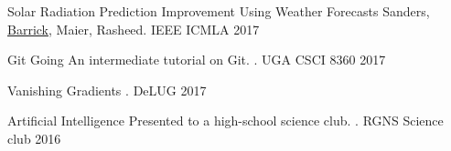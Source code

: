 
\begin{cvhonors}

\cvhonor
{Solar Radiation Prediction Improvement Using Weather Forecasts}
{Sanders, \underline{Barrick}, Maier, Rasheed.}
{IEEE ICMLA}
{2017}

\end{cvhonors}


\begin{cvhonors}

\cvhonor
{Git Going}
{An intermediate tutorial on Git. .}
{UGA CSCI 8360}
{2017}

\cvhonor
{Vanishing Gradients}
{.}
{DeLUG}
{2017}

\cvhonor
{Artificial Intelligence}
{Presented to a high-school science club. .}
{RGNS Science club}
{2016}

\end{cvhonors}
